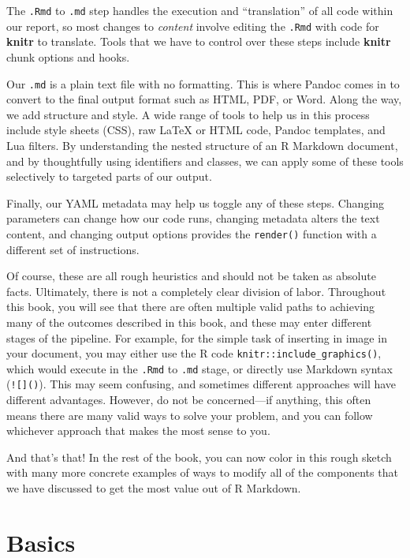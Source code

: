 \documentclass[
  11pt,
]{krantz}
\begin{document}
The \texttt{.Rmd} to \texttt{.md} step handles the execution and ``translation'' of all code within our report, so most changes to \emph{content} involve editing the \texttt{.Rmd} with code for \textbf{knitr} to translate. Tools that we have to control over these steps include \textbf{knitr} chunk options and hooks.

Our \texttt{.md} is a plain text file with no formatting. This is where Pandoc comes in to convert to the final output format such as HTML, PDF, or Word. Along the way, we add structure and style. A wide range of tools to help us in this process include style sheets (CSS), raw LaTeX or HTML code, Pandoc templates, and Lua filters. By understanding the nested structure of an R Markdown document, and by thoughtfully using identifiers and classes, we can apply some of these tools selectively to targeted parts of our output.

Finally, our YAML metadata may help us toggle any of these steps. Changing parameters can change how our code runs, changing metadata alters the text content, and changing output options provides the \texttt{render()} function with a different set of instructions.

Of course, these are all rough heuristics and should not be taken as absolute facts. Ultimately, there is not a completely clear division of labor. Throughout this book, you will see that there are often multiple valid paths to achieving many of the outcomes described in this book, and these may enter different stages of the pipeline. For example, for the simple task of inserting in image in your document, you may either use the R code \texttt{knitr::include\_graphics()}, which would execute in the \texttt{.Rmd} to \texttt{.md} stage, or directly use Markdown syntax (\texttt{!{[}{]}()}). This may seem confusing, and sometimes different approaches will have different advantages. However, do not be concerned---if anything, this often means there are many valid ways to solve your problem, and you can follow whichever approach that makes the most sense to you.

And that's that! In the rest of the book, you can now color in this rough sketch with many more concrete examples of ways to modify all of the components that we have discussed to get the most value out of R Markdown.

\hypertarget{basics}{%
\chapter{Basics}\label{basics}}
\end{document}
